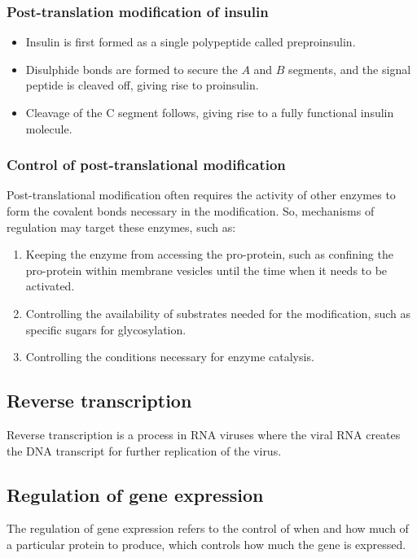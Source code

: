 \documentclass[11pt]{article}
\begin{document}
\subsubsection{Post-translation modification of insulin}
\label{sec:org89850c5}
\begin{itemize}
\item Insulin is first formed as a single polypeptide called preproinsulin.
\item Disulphide bonds are formed to secure the \(A\) and \(B\) segments, and the signal peptide is cleaved off, giving rise to proinsulin.
\item Cleavage of the C segment follows, giving rise to a fully functional insulin molecule.
\end{itemize}
\subsubsection{Control of post-translational modification}
\label{sec:org79de9bc}
Post-translational modification often requires the activity of other enzymes to form the covalent bonds necessary in the modification. So, mechanisms of regulation may target these enzymes, such as:
\begin{enumerate}
\item Keeping the enzyme from accessing the pro-protein, such as confining the pro-protein within membrane vesicles until the time when it needs to be activated.
\item Controlling the availability of substrates needed for the modification, such as specific sugars for glycosylation.
\item Controlling the conditions necessary for enzyme catalysis.
\end{enumerate}
\subsection{Reverse transcription}
\label{sec:org6e9c87f}
Reverse transcription is a process in RNA viruses where the viral RNA creates the DNA transcript for further replication of the virus.

\newpage
\subsection{Regulation of gene expression}
\label{sec:org0e3524e}
The regulation of gene expression refers to the control of when and how much of a particular protein to produce, which controls how much the gene is expressed.
\end{document}
